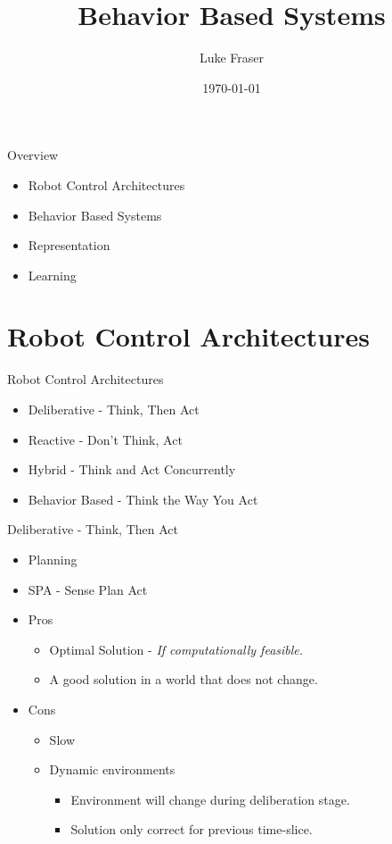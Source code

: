 \documentclass{beamer}
\title[Behavior Based Architectures]{Behavior Based Systems}
\author{Luke Fraser}
\date{\today}
\begin{document}
\begin{frame}
 \titlepage
\end{frame}

\begin{frame}{Overview}
 \begin{itemize}
  \item Robot Control Architectures
  \item Behavior Based Systems
  \item Representation
  \item Learning
 \end{itemize}
\end{frame}
\section{Robot Control Architectures}
\begin{frame}{Robot Control Architectures}
 \begin{itemize}
  \item Deliberative - Think, Then Act
  \item Reactive - Don't Think, Act
  \item Hybrid - Think and Act Concurrently
  \item Behavior Based - Think the Way You Act
 \end{itemize}
\end{frame}

\begin{frame}{Deliberative - Think, Then Act}
 \begin{itemize}
  \item Planning
  \item SPA - Sense Plan Act
  \item Pros
  \begin{itemize}
   \item Optimal Solution - \emph{If computationally feasible.}
   \item A good solution in a world that does not change.
  \end{itemize}
  \item Cons
  \begin{itemize}
   \item Slow
   \item Dynamic environments
   \begin{itemize}
    \item Environment will change during deliberation stage.
    \item Solution only correct for previous time-slice.
   \end{itemize}
  \end{itemize}
 \end{itemize}
\end{frame}
\end{document}
